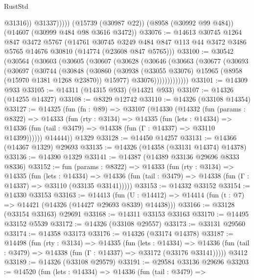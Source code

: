 \begin{lexlean}{RustStd}
\begin{coremodule}
                  @31316))
              @31337)))))
    (@15739 (@30987 @22))
    (@8958 (@30992 @99 @484))
    (@14607 (@30999 @484 @98 @3616 @3472))
@33076 := @14613
    @30745
    @1264
    @847
    @3472
    @5767
    (@14761
      @30745
      @3249
      @484
      @847
      @113
      @44
      @3472
      @3486
      @5765
      @14676
      @30810
      (@14774 (@23608 @847 @5765)))
@33100 := @30542
    (@30564
      (@30603
        (@30605
          (@30607
            (@30628
              (@30646
                (@30663
                  (@30677
                    (@30693
                      (@30697
                        (@30744
                          (@30848
                            (@30860
                              (@30938
                                (@33055 @33076)
                                @15965
                                (@8958 (@15970 @1381 @1268 @23870))
                                @15977)
                              @33076)))))))))))))
@33101 := @14309 @933
@33105 := @14311 (@14315 @933) (@14321 @933)
@33107 := @14326 (@14255 @14327)
@33108 := @8329 @12742
@33110 := @14326 (@33108 @14354)
@33127 := @14325
    (fun (fn : @89) =>
    @33107
      (@14330
        (@14332
          (fun (params : @8322) =>
          @14333
            (fun (rty : @3134) =>
            @14335
              (fun (lets : @14334) =>
              @14336 (fun (tail : @3479) => @14338 (fun (Γ : @14337) => @33110 @14399))))))
        @14444))
    @1329
@33128 := @14450 @14257
@33131 := @14366 (@14367 @1329) @29693
@33135 := @14326 (@14358 (@33131 @14374) @14378)
@33136 := @14390 @1329
@33141 := @14387 (@14389 @33136 @29696 @8333 @8336)
@33152 := fun (params : @8322) =>
  @14333
    (fun (rty : @3134) =>
    @14335
      (fun (lets : @14334) =>
      @14336 (fun (tail : @3479) => @14338 (fun (Γ : @14337) => @33110 (@33135 @33141)))))
@33153 := @14332 @33152
@33154 := @14330 @33153
@33163 := @14413
    (fun (U : @14412) => @14414 (fun (t : @7) => @14421 (@14326 (@14427 @29693 @8339) @14438)))
@33166 := @33128 (@33154 @33163) @29691
@33168 := @14311 @33153 @33163
@33170 := @14495 @33152 @5539
@33172 := @14326 (@33108 @29557)
@33173 := @33131 @29560
@33174 := @14358 @33173
@33176 := @14326 (@33174 @14378)
@33187 := @14498
    (fun (rty : @3134) =>
    @14335
      (fun (lets : @14334) =>
      @14336 (fun (tail : @3479) => @14338 (fun (Γ : @14337) => @33172 (@33176 @33141)))))
    @3412
@33189 := @14326 (@33108 @29579)
@33191 := @29584 @33136 @29696
@33203 := @14520
    (fun (lets : @14334) =>
    @14336
      (fun (tail : @3479) =>

\end{coremodule}
\end{lexlean}
